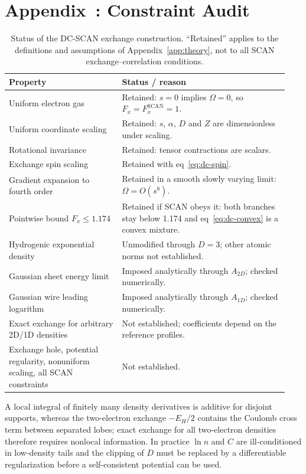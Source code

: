 \documentclass[journal=jctcce,manuscript=article]{achemso}
\begin{document}
\section*{Appendix~\thesection: Constraint Audit}
\label{app:constraints}
\renewcommand{\thetable}{B\arabic{table}}
\setcounter{table}{0}
\begin{table}[H]
\centering
\caption{Status of the DC-SCAN exchange construction.  ``Retained'' applies to
  the definitions and assumptions of Appendix~\ref{app:theory}, not to all
  SCAN exchange--correlation conditions.}
\label{tab:constraints}
\small
\begin{tabular}{@{}p{0.38\linewidth}p{0.56\linewidth}@{}}
\toprule
Property & Status / reason \\
\midrule
Uniform electron gas & Retained: $s=0$ implies $\Omega=0$, so $F_x=F_x^{\mathrm{SCAN}}=1$. \\
Uniform coordinate scaling & Retained: $s$, $\alpha$, $D$ and $Z$ are dimensionless under scaling. \\
Rotational invariance & Retained: tensor contractions are scalars. \\
Exchange spin scaling & Retained with eq~\ref{eq:dc-spin}. \\
Gradient expansion to fourth order & Retained in a smooth slowly varying limit: $\Omega=O(s^8)$. \\
Pointwise bound $F_x\le1.174$ & Retained if SCAN obeys it: both branches stay below 1.174 and eq~\ref{eq:dc-convex} is a convex mixture. \\
Hydrogenic exponential density & Unmodified through $D=3$; other atomic norms not established. \\
Gaussian sheet energy limit & Imposed analytically through $A_{2D}$; checked numerically. \\
Gaussian wire leading logarithm & Imposed analytically through $A_{1D}$; checked numerically. \\
Exact exchange for arbitrary 2D/1D densities & Not established; coefficients depend on the reference profiles. \\
Exchange hole, potential regularity, nonuniform scaling, all SCAN constraints & Not established. \\
\bottomrule
\end{tabular}
\end{table}
A local integral of finitely many density derivatives is additive for
disjoint supports, whereas the two-electron exchange $-E_H/2$ contains the
Coulomb cross term between separated lobes; exact exchange for all
two-electron densities therefore requires nonlocal information.  In practice
$\ln n$ and $C$ are ill-conditioned in low-density tails and the clipping of
$D$ must be replaced by a differentiable regularization before a
self-consistent potential can be used.
\end{document}
